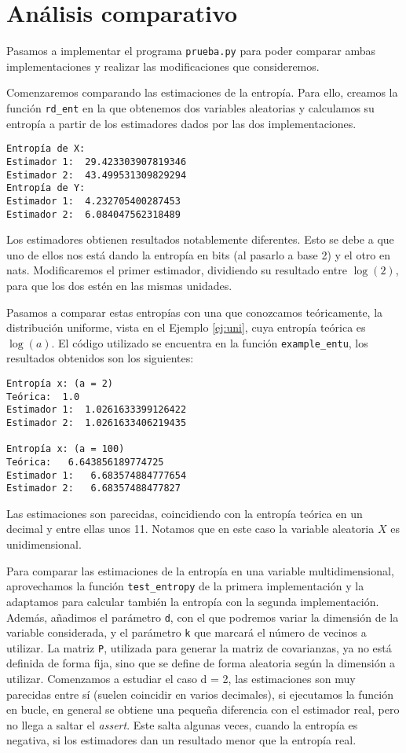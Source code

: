 \documentclass[12pt,a4paper]{report} %
\theoremstyle{definition}
\begin{document}
\section{Análisis comparativo}

Pasamos a implementar el programa \texttt{prueba.py} para poder comparar ambas implementaciones y realizar las modificaciones que consideremos.

Comenzaremos comparando las estimaciones de la entropía. Para ello, creamos la función \texttt{rd\_ent} en la que obtenemos dos variables aleatorias y calculamos su entropía a partir de los estimadores dados por las dos implementaciones.

\begin{lstlisting}
Entropía de X:
Estimador 1:  29.423303907819346
Estimador 2:  43.499531309829294
Entropía de Y:
Estimador 1:  4.232705400287453
Estimador 2:  6.084047562318489
\end{lstlisting}

Los estimadores obtienen resultados notablemente diferentes. Esto se debe a que uno de ellos nos está dando la entropía en bits (al pasarlo a base 2) y el otro en nats. Modificaremos el primer estimador, dividiendo su resultado entre $\log(2)$, para que los dos estén en las mismas unidades.

Pasamos a comparar estas entropías con una que conozcamos teóricamente, la distribución uniforme, vista en el Ejemplo \ref{ej:uni}, cuya entropía teórica es $\log(a)$. El código utilizado se encuentra en la función \texttt{example\_entu}, los resultados obtenidos son los siguientes:

\begin{lstlisting}
Entropía x: (a = 2)
Teórica:  1.0
Estimador 1:  1.0261633399126422
Estimador 2:  1.0261633406219435

Entropía x: (a = 100)
Teórica:   6.643856189774725
Estimador 1:   6.683574884777654
Estimador 2:   6.68357488477827
\end{lstlisting}

Las estimaciones son parecidas, coincidiendo con la entropía teórica en un decimal y entre ellas unos 11. Notamos que en este caso la variable aleatoria $X$ es unidimensional.

Para comparar las estimaciones de la entropía en una variable multidimensional, aprovechamos la función \texttt{test\_entropy} de la primera implementación y la adaptamos para calcular también la entropía con la segunda implementación. Además, añadimos el parámetro \texttt{d}, con el que podremos variar la dimensión de la variable considerada, y el parámetro \texttt{k} que marcará el número de vecinos a utilizar. La matriz \texttt{P}, utilizada para generar la matriz de covarianzas, ya no está definida de forma fija, sino que se define de forma aleatoria según la dimensión a utilizar. Comenzamos a estudiar el caso d = 2, las estimaciones son muy parecidas entre sí (suelen coincidir en varios decimales), si ejecutamos la función en bucle, en general se obtiene una pequeña diferencia con el estimador real, pero no llega a saltar el \textit{assert}. Este salta algunas veces, cuando la entropía es negativa, si los estimadores dan un resultado menor que la entropía real.
\end{document}

